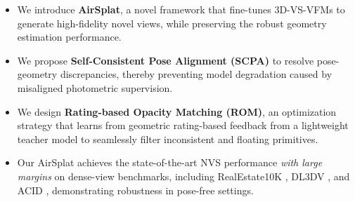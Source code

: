 \begin{itemize}
  \setlength\itemsep{0.1cm}
  \item We introduce \textbf{AirSplat}, a novel framework that fine-tunes 3D-VS-VFMs to generate high-fidelity novel views, while preserving the robust geometry estimation performance.
  \item We propose \textbf{Self-Consistent Pose Alignment (SCPA)} to resolve pose-geometry discrepancies, thereby preventing model degradation caused by misaligned photometric supervision.
  \item We design \textbf{Rating-based Opacity Matching (ROM)}, an optimization strategy that learns from geometric rating-based feedback from a lightweight teacher model to seamlessly filter inconsistent and floating primitives.
  \item Our AirSplat achieves the state-of-the-art NVS performance \textit{with large margins} on dense-view benchmarks, including RealEstate10K \cite{zhou2018stereo}, DL3DV \cite{ling2024dl3dv}, and ACID \cite{infinite_nature_2020}, demonstrating robustness in pose-free settings.
\end{itemize}



